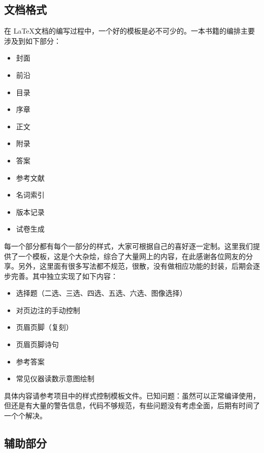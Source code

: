 \subsection{文档格式}

在 \LaTeX 文档的编写过程中，一个好的模板是必不可少的。一本书籍的编排主要涉及到如下部分：

\begin{multicols}{3}       
\begin{itemize}
	\item 
	封面
	\item 
	前沿
	\item 
	目录
	\item 
	序章
	\item 
	正文
	\item 
	附录
	\item 
	答案
	\item 
	参考文献
	\item 
	名词索引
	\item 
	版本记录
	\item 
	试卷生成
\end{itemize}
\end{multicols}


每一个部分都有每个一部分的样式，大家可根据自己的喜好逐一定制。这里我们提供了一个模板，这是个大杂烩，综合了大量网上的内容，在此感谢各位网友的分享。另外，这里面有很多写法都不规范，很散，没有做相应功能的封装，后期会逐步完善。其中独立实现了如下内容：
\begin{multicols}{3}       
\begin{itemize}
	\item
	选择题（二选、三选、四选、五选、六选、图像选择）
	\item 
	对页边注的手动控制
	\item 
	页眉页脚（复刻）
	\item 
	页眉页脚诗句
	\item 
	参考答案
	\item 
	常见仪器读数示意图绘制
\end{itemize}
\end{multicols}

具体内容请参考项目中的样式控制模板文件。已知问题：虽然可以正常编译使用，但还是有大量的警告信息，代码不够规范，有些问题没有考虑全面，后期有时间了一个个解决。


\subsection{辅助部分}

